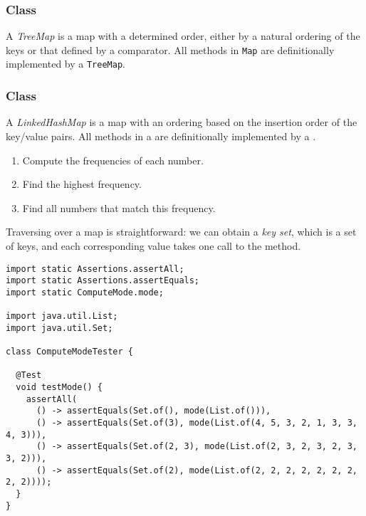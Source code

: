 \subsubsection{ Class}
A \emph{TreeMap} is a map with a determined order, either by a natural ordering of the keys or that defined by a comparator. All methods in \texttt{Map} are definitionally implemented by a \texttt{TreeMap}.

\subsubsection{ Class}
A \emph{LinkedHashMap} is a map with an ordering based on the insertion order of the key/value pairs. All methods in a  are definitionally implemented by a .


\begin{enumerate}
  \item Compute the frequencies of each number.
  \item Find the highest frequency.
  \item Find all numbers that match this frequency.
\end{enumerate}

Traversing over a map is straightforward: we can obtain a \emph{key set}, which is a set of keys, and each corresponding value takes one call to the  method.

\begin{cl}[]{}
\begin{lstlisting}[language=MyJava]
import static Assertions.assertAll;
import static Assertions.assertEquals;
import static ComputeMode.mode;

import java.util.List;
import java.util.Set;

class ComputeModeTester {

  @Test
  void testMode() {
    assertAll(
      () -> assertEquals(Set.of(), mode(List.of())),  
      () -> assertEquals(Set.of(3), mode(List.of(4, 5, 3, 2, 1, 3, 3, 4, 3))),
      () -> assertEquals(Set.of(2, 3), mode(List.of(2, 3, 2, 3, 2, 3, 3, 2))),
      () -> assertEquals(Set.of(2), mode(List.of(2, 2, 2, 2, 2, 2, 2, 2, 2))));
  }
}
\end{lstlisting}
\end{cl}

